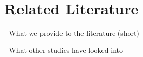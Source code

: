 \section{Related Literature} \label{sec:literature}

- What we provide to the literature (short) 

- What other studies have looked into

